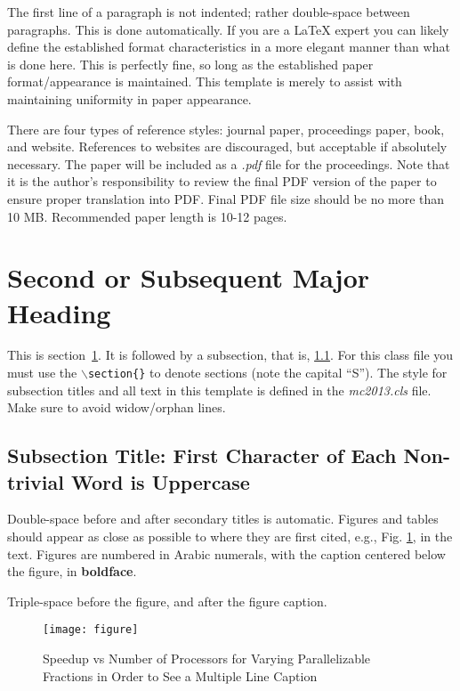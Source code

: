 \documentclass{ansconf}
\begin{document}
The first line of a paragraph is not indented; rather double-space between 
paragraphs.  This is done automatically. If you are a {\LaTeX} expert you 
can likely define the established format characteristics in a more elegant 
manner than what is done here.  This is perfectly fine, so long as the 
established paper format/appearance is maintained.  This template is merely 
to assist with maintaining uniformity in paper appearance.

There are four types of reference styles: journal paper\cite{journal},
proceedings paper\cite{proc_paper}, book\cite{book}, and website\cite{techrep}.
References to websites are discouraged, but acceptable if absolutely necessary.
The paper will be included as a {\it .pdf} file for the proceedings. Note that
it is the author's responsibility to review the final PDF version of the paper
to ensure proper translation into PDF.  Final PDF file size should be no more
than 10 MB. Recommended paper length is 10-12 pages.

\section{Second or Subsequent Major Heading}
\label{sec:first}

This is section~\ref{sec:first}. It is followed by a subsection, that is, 
\ref{sec:second}. For this class file you must use the 
\texttt{$\backslash$section\{\}} to denote sections (note the capital ``S'').  
The style for subsection titles and all text in this template is defined in 
the {\it mc2013.cls} file.  Make sure to avoid widow/orphan lines.


\subsection{Subsection Title: First Character of Each Non-trivial Word is 
Uppercase} 
\label{sec:second}

Double-space before and after secondary titles is automatic.  Figures and 
tables should appear as close as possible to where they are first
cited, e.g., Fig. \ref{fig:amdahl}, in the text.  Figures are numbered in 
Arabic numerals, with the caption centered below the figure, in 
{\bf boldface}.
  
Triple-space before the figure, and after the figure caption.

%
\vspace{16pt}
\begin{figure}[!htb]
\begin{spacing}{1.0}
\centering
\texttt{[image: figure]}
\caption{Speedup vs Number of Processors for Varying Parallelizable Fractions in
  Order to See a Multiple Line Caption}
\label{fig:amdahl}
\end{spacing}
\end{figure}
\vspace{16pt}
%
\end{document}
